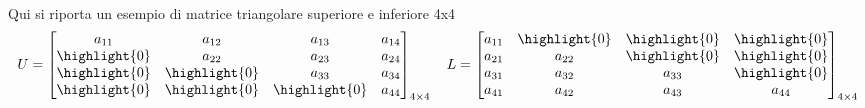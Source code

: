 	\leavevmode\\
	Qui si riporta un esempio di matrice triangolare superiore e inferiore 4x4
	$$
	U = \begin{bmatrix}
		a_{11} & a_{12} & a_{13} & a_{14} \\
		\highlight{0} & a_{22} & a_{23} & a_{24} \\
		\highlight{0} & \highlight{0} & a_{33} & a_{34} \\
		\highlight{0} & \highlight{0} & \highlight{0} & a_{44}
	\end{bmatrix}_{4 \times 4}
	\quad
	L = \begin{bmatrix}
		a_{11} & \highlight{0} & \highlight{0} & \highlight{0} \\
		a_{21} & a_{22} & \highlight{0} & \highlight{0} \\
		a_{31} & a_{32} & a_{33} & \highlight{0} \\
		a_{41} & a_{42} & a_{43} & a_{44}
	\end{bmatrix}_{4 \times 4}
	$$
